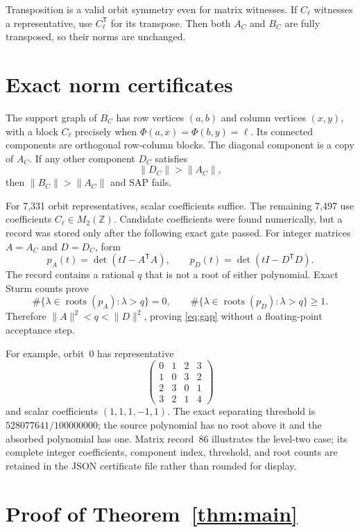 \documentclass[11pt]{article}
\begin{document}
Transposition is a valid orbit symmetry even for matrix witnesses.  If
$C_\ell$ witnesses a representative, use $C_\ell^{\mathsf T}$ for its
transpose.  Then both $A_C$ and $B_C$ are fully transposed, so their norms are
unchanged.

\section{Exact norm certificates}

The support graph of $B_C$ has row vertices $(a,b)$ and column vertices
$(x,y)$, with a block $C_\ell$ precisely when
$\Phi(a,x)=\Phi(b,y)=\ell$.  Its connected components are orthogonal
row-column blocks.  The diagonal component is a copy of $A_C$.  If any other
component $D_C$ satisfies
\begin{equation}\label{eq:gap}
 \|D_C\|>\|A_C\|,
\end{equation}
then $\|B_C\|>\|A_C\|$ and SAP fails.

For 7,331 orbit representatives, scalar coefficients suffice.  The remaining
7,497 use coefficients $C_\ell\in M_2(\mathbb Z)$.  Candidate coefficients
were found numerically, but a record was stored only after the following exact
gate passed.  For integer matrices $A=A_C$ and $D=D_C$, form
\[
 p_A(t)=\det(tI-A^{\mathsf T}A),\qquad
 p_D(t)=\det(tI-D^{\mathsf T}D).
\]
The record contains a rational $q$ that is not a root of either polynomial.
Exact Sturm counts prove
\[
 \#\{\lambda\in\operatorname{roots}(p_A):\lambda>q\}=0,
 \qquad
 \#\{\lambda\in\operatorname{roots}(p_D):\lambda>q\}\ge1.
\]
Therefore $\|A\|^2<q<\|D\|^2$, proving \eqref{eq:gap} without a
floating-point acceptance step.

For example, orbit~0 has representative
\[
 \begin{pmatrix}
 0&1&2&3\\1&0&3&2\\2&3&0&1\\3&2&1&4
 \end{pmatrix}
\]
and scalar coefficients $(1,1,1,-1,1)$.  The exact separating threshold is
$528077641/100000000$; the source polynomial has no root above it and the
absorbed polynomial has one.  Matrix record~86 illustrates the level-two
case; its complete integer coefficients, component index, threshold, and root
counts are retained in the JSON certificate file rather than rounded for
display.

\section{Proof of Theorem~\ref{thm:main}}
\end{document}
